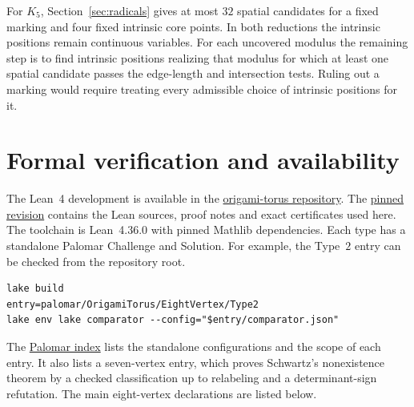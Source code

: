 \documentclass[11pt,letterpaper]{amsart}
\newcommand{\release}{bd3a0e03908481d738df30233cf95c641a1d3f71}
\newcommand{\reporef}[2]{\href{https://github.com/vltanh/lean4-origami-torus/blob/\release/#1}{#2}}
\begin{document}
For \(K_5\), Section~\ref{sec:radicals} gives at most \(32\)
spatial candidates for a fixed marking and four fixed intrinsic
core points. In both reductions the intrinsic positions remain
continuous variables. For each uncovered modulus the remaining step
is to find intrinsic positions realizing that modulus for which at
least one spatial candidate passes the edge-length and intersection
tests. Ruling out a marking would require treating every admissible
choice of intrinsic positions for it.

\section{Formal verification and availability}

The Lean~4 development is available in the
\href{https://github.com/vltanh/lean4-origami-torus}{origami-torus repository}.
The \href{https://github.com/vltanh/lean4-origami-torus/commit/\release}{pinned revision}
contains the Lean sources, proof notes and exact certificates used
here. The toolchain is Lean~4.36.0 with pinned Mathlib dependencies.
Each type has a standalone Palomar Challenge and Solution.
For example, the Type~\(2\) entry can be checked from the repository root.
{\small
\begin{verbatim}
lake build
entry=palomar/OrigamiTorus/EightVertex/Type2
lake env lake comparator --config="$entry/comparator.json"
\end{verbatim}
}
The
\reporef{palomar/OrigamiTorus/README.md}{Palomar index}
lists the standalone configurations and the scope of each entry.
It also lists a seven-vertex entry, which proves Schwartz's
nonexistence theorem by a checked classification up to relabeling
and a determinant-sign refutation. The main eight-vertex declarations
are listed below.
\end{document}
